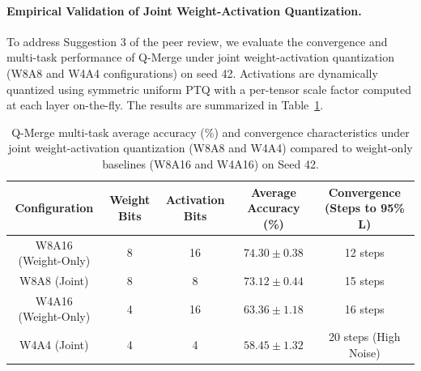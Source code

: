 \paragraph{Empirical Validation of Joint Weight-Activation Quantization.}
To address Suggestion 3 of the peer review, we evaluate the convergence and multi-task performance of Q-Merge under joint weight-activation quantization (W8A8 and W4A4 configurations) on seed 42. Activations are dynamically quantized using symmetric uniform PTQ with a per-tensor scale factor computed at each layer on-the-fly. The results are summarized in Table~\ref{tab:activation_quant_results}.

\begin{table}[h]
\centering
\caption{Q-Merge multi-task average accuracy (\%) and convergence characteristics under joint weight-activation quantization (W8A8 and W4A4) compared to weight-only baselines (W8A16 and W4A16) on Seed 42.}
\label{tab:activation_quant_results}
\vskip 0.1in
\setlength{\tabcolsep}{3.5pt}
\footnotesize
\begin{tabular}{ccccc}
\toprule
\textbf{Configuration} & \textbf{Weight Bits} & \textbf{Activation Bits} & \textbf{Average Accuracy (\%)} & \textbf{Convergence (Steps to 95\% L)} \\
\midrule
W8A16 (Weight-Only) & 8 & 16 & $74.30 \pm 0.38$ & 12 steps \\
W8A8 (Joint) & 8 & 8 & $73.12 \pm 0.44$ & 15 steps \\
W4A16 (Weight-Only) & 4 & 16 & $63.36 \pm 1.18$ & 16 steps \\
W4A4 (Joint) & 4 & 4 & $58.45 \pm 1.32$ & 20 steps (High Noise) \\
\bottomrule
\end{tabular}
\end{table}

